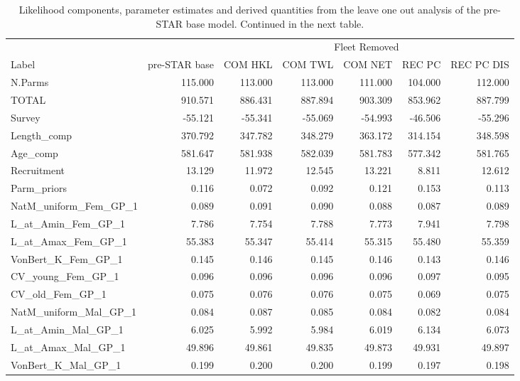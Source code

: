 \documentclass[11pt,
  english,
]{article}
\begin{document}
\FloatBarrier

\begin{landscape}\begin{table}

\caption{\label{tab:drop-one}Likelihood components, parameter estimates and derived quantities from the leave one out analysis of the pre-STAR base model. Continued in the next table.}
\centering
\begin{tabular}[t]{lrrrrrr}
\toprule
\multicolumn{2}{c}{ } & \multicolumn{5}{c}{Fleet Removed} \\
\cmidrule(l{3pt}r{3pt}){3-7}
Label & pre-STAR base & COM HKL & COM TWL & COM NET & REC PC & REC PC DIS\\
\midrule
N.Parms & 115.000 & 113.000 & 113.000 & 111.000 & 104.000 & 112.000\\
TOTAL & 910.571 & 886.431 & 887.894 & 903.309 & 853.962 & 887.799\\
Survey & -55.121 & -55.341 & -55.069 & -54.993 & -46.506 & -55.296\\
Length\_comp & 370.792 & 347.782 & 348.279 & 363.172 & 314.154 & 348.598\\
Age\_comp & 581.647 & 581.938 & 582.039 & 581.783 & 577.342 & 581.765\\
Recruitment & 13.129 & 11.972 & 12.545 & 13.221 & 8.811 & 12.612\\
Parm\_priors & 0.116 & 0.072 & 0.092 & 0.121 & 0.153 & 0.113\\
NatM\_uniform\_Fem\_GP\_1 & 0.089 & 0.091 & 0.090 & 0.088 & 0.087 & 0.089\\
L\_at\_Amin\_Fem\_GP\_1 & 7.786 & 7.754 & 7.788 & 7.773 & 7.941 & 7.798\\
L\_at\_Amax\_Fem\_GP\_1 & 55.383 & 55.347 & 55.414 & 55.315 & 55.480 & 55.359\\
VonBert\_K\_Fem\_GP\_1 & 0.145 & 0.146 & 0.145 & 0.146 & 0.143 & 0.146\\
CV\_young\_Fem\_GP\_1 & 0.096 & 0.096 & 0.096 & 0.096 & 0.097 & 0.095\\
CV\_old\_Fem\_GP\_1 & 0.075 & 0.076 & 0.076 & 0.075 & 0.069 & 0.075\\
NatM\_uniform\_Mal\_GP\_1 & 0.084 & 0.087 & 0.085 & 0.084 & 0.082 & 0.084\\
L\_at\_Amin\_Mal\_GP\_1 & 6.025 & 5.992 & 5.984 & 6.019 & 6.134 & 6.073\\
L\_at\_Amax\_Mal\_GP\_1 & 49.896 & 49.861 & 49.835 & 49.873 & 49.931 & 49.897\\
VonBert\_K\_Mal\_GP\_1 & 0.199 & 0.200 & 0.200 & 0.199 & 0.197 & 0.198\\

\end{tabular}
\end{table}
\end{landscape}
\end{document}
